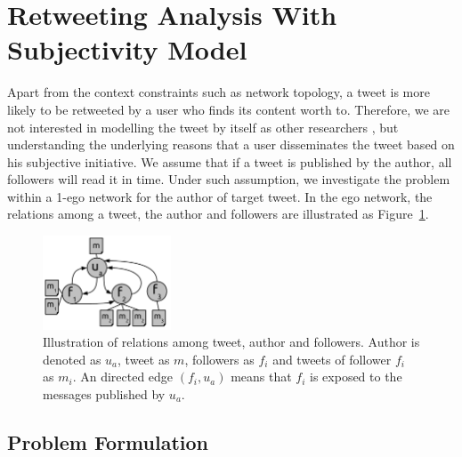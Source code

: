 \documentclass{acm_proc_article-sp}
\begin{document}
\section{Retweeting Analysis With Subjectivity Model}

Apart from the context constraints such as network topology, a tweet is more likely to be retweeted by a user who finds its content worth to. 
Therefore, we are not interested in modelling the tweet by itself as other researchers \cite{naveed2011searching,pfitzner2012emotional}, but understanding the underlying reasons that a user disseminates the tweet based on his subjective initiative. 
We assume that if a tweet is published by the author, all followers will read it in time. 
Under such assumption, we investigate the problem within a 1-ego network for the author of target tweet. 
In the ego network, the relations among a tweet, the author and followers are illustrated as Figure~\ref{fig1}.
\begin{figure}[htb]
\centering
\includegraphics[width=1.5in,height=1.1in]{ego.pdf}
\caption{Illustration of relations among tweet, author and followers. Author is denoted as $ u_{a} $, tweet as $ m $, followers as $ f_{i} $ and tweets of follower $ f_{i} $ as $ m_{i} $. An directed edge $ \left( f_{i},u_{a} \right)  $ means that $ f_{i} $ is exposed to the messages published by $ u_{a} $.}
\label{fig1}
\end{figure}

\subsection{Problem Formulation}
\label{formulation}
\end{document}
